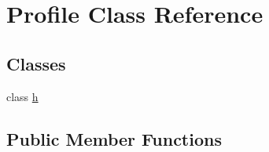 \hypertarget{class_profile}{}\section{Profile Class Reference}
\label{class_profile}
\subsection*{Classes}
\begin{DoxyCompactItemize}
\item 
class \hyperlink{class_profile_1_1h}{h}
\end{DoxyCompactItemize}
\subsection*{Public Member Functions}
